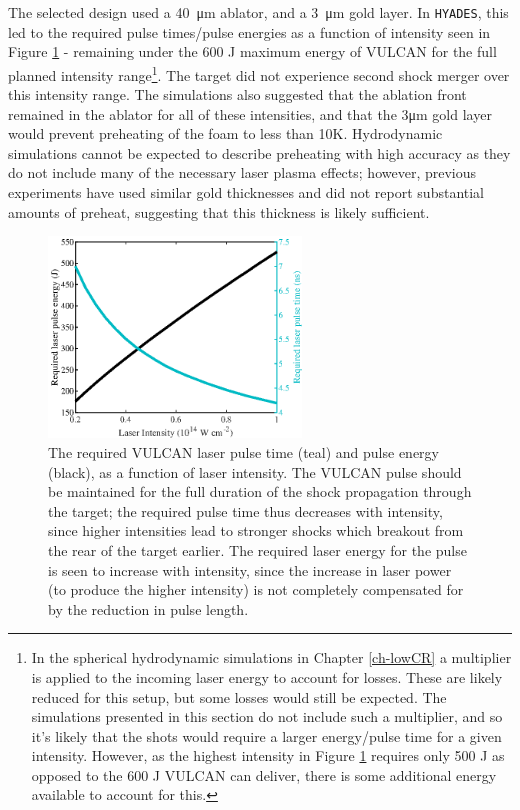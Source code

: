 The selected design used a 40~\unit{\micro\meter} ablator, and a 3~\unit{\micro\meter} gold layer. In \texttt{HYADES}, this led to the required pulse times/pulse energies as a function of intensity seen in Figure \ref{fig:VULCAN energy} - remaining under the 600 J maximum energy of VULCAN for the full planned intensity range\footnote{In the spherical hydrodynamic simulations in Chapter \ref{ch-lowCR} a multiplier is applied to the incoming laser energy to account for losses. These are likely reduced for this setup, but some losses would still be expected. The simulations presented in this section do not include such a multiplier, and so it's likely that the shots would require a larger energy/pulse time for a given intensity. However, as the highest intensity in Figure \ref{fig:VULCAN energy} requires only 500 J as opposed to the 600 J VULCAN can deliver, there is some additional energy available to account for this. }. The target did not experience second shock merger over this intensity range. The simulations also suggested that the ablation front remained in the ablator for all of these intensities, and that the 3\unit{\micro\meter} gold layer would prevent preheating of the foam to less than 10K. Hydrodynamic simulations cannot be expected to describe preheating with high accuracy as they do not include many of the necessary laser plasma effects; however, previous experiments have used similar gold thicknesses and did not report substantial amounts of preheat, suggesting that this thickness is likely sufficient.


\begin{figure}[hbt!]
\centering
\includegraphics[width=0.6\textwidth]{figures/Experiment/EnergyandPulsetimes_edit.eps}%
\caption{\label{fig:VULCAN energy} The required VULCAN laser pulse time (teal) and pulse energy (black), as a function of laser intensity. The VULCAN pulse should be maintained for the full duration of the shock propagation through the target; the required pulse time thus decreases with intensity, since higher intensities lead to stronger shocks which breakout from the rear of the target earlier. The required laser energy for the pulse is seen to increase with intensity, since the increase in laser power (to produce the higher intensity) is not completely compensated for by the reduction in pulse length.}
\end{figure}

